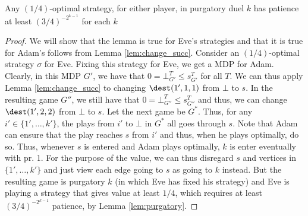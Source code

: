 \begin{lemma}
Any $(1/4)$-optimal strategy, for either player, in purgatory duel $k$ has patience at least $(3/4)^{-2^{k-1}}$ for each $k$
\end{lemma}
\begin{proof}
We will show that the lemma is true for Eve's strategies and that it is true for Adam's follows from Lemma \ref{lem:change_succ}.
Consider an $(1/4)$-optimal strategy $\sigma$ for Eve. Fixing this strategy for Eve, we get a MDP for Adam. Clearly, in this MDP $G'$, we have that $0=\bot^T_{G'}\leq s^T_{G'}$ for all $T$. We can thus apply Lemma \ref{lem:change_succ} to changing $\dest(1',1,1)$ from $\bot$ to $s$. In the resulting game $G''$, 
we still have that $0=\bot^T_{G''}\leq s^T_{G''}$ and thus, we can change $\dest(1',2,2)$ from $\bot$ to $s$.
Let the next game be $G^*$.
Thus, for any $i'\in \{1',\dots,k'\}$, the plays from $i'$ to $\bot$ in $G^*$ all goes through $s$. Note that Adam can ensure that the play reaches $s$ from $i'$ and thus, when he plays optimally, do so.
Thus, whenever $s$ is entered and Adam plays optimally, $k$ is enter eventually with pr. 1.
For the purpose of the value, we can thus disregard $s$ and vertices in $\{1',\dots,k'\}$ and just view each edge going to $s$ as going to $k$ instead.
But the resulting game is purgatory $k$ (in which Eve has fixed his strategy) and Eve is playing a strategy that gives value at least $1/4$, which requires  at least $(3/4)^{-2^{k-1}}$ patience, by Lemma \ref{lem:purgatory}.
\end{proof}
